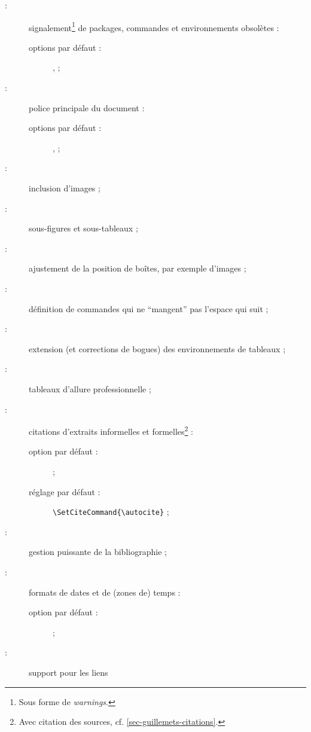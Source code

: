 \documentclass[french,nolocaltoc]{nwejmart}
\newtheorem[style=definition]{fait}
\newtheorem[title=expérience]{experience}
\newtheorem[title-plural=anneaux]{anneau}
\newtheorem[title=idéal,title-plural=idéaux]{ideal}
\begin{document}
\begin{description}
\item[ :] signalement\footnote{Sous forme de \emph{warnings}.} de
  packages, commandes et environnements obsolètes :
  \begin{description}
  \item[options par défaut :] ,  ;
  \end{description}
\item[ :] police principale du document :
  \begin{description}
  \item[options par défaut :] ,  ;
  \end{description}
\item[ :] inclusion d'images ;
\item[ :] sous-figures et sous-tableaux ;
\item[ :] ajustement de la position de boîtes, par exemple
  d'images ;
\item[ :] définition de commandes qui ne \enquote{mangent} pas
  l'espace qui suit ;
\item[ :] extension (et corrections de bogues) des
  environnements de tableaux ;
\item[ :] tableaux d'allure professionnelle ;
\item[ :] citations d'extraits informelles et
  formelles\footnote{Avec citation des sources,
    cf. \vref{sec-guillemets-citations}.} :
    \begin{description}
    \item[option par défaut :]  ;
    \item[réglage par défaut :]
      \lstinline[alsolanguage={[csquotes]TeX},alsolanguage={[biblatex]TeX}]|\SetCiteCommand{\autocite}| ;
  \end{description}
\item[ :] gestion puissante de la bibliographie ;
\item[ :] formats de dates et de (zones de) temps :
  \begin{description}
  \item[option par défaut :]  ;
  \end{description}
\item[ :] support pour les liens

\end{description}
\end{document}
